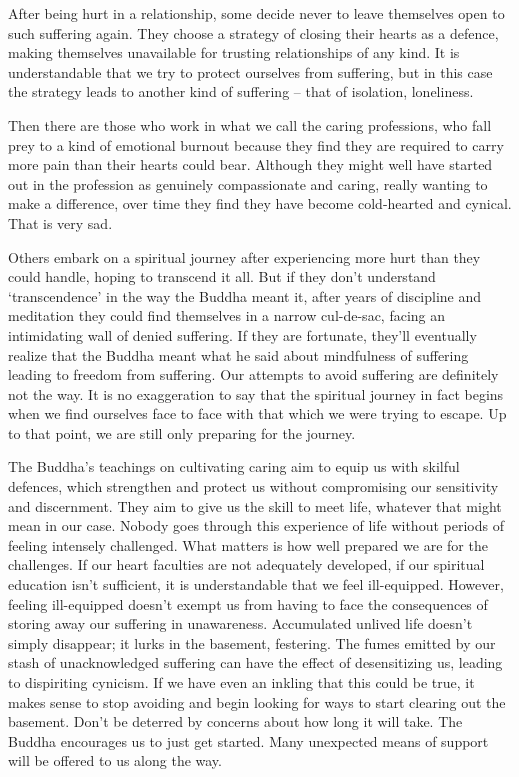 After being hurt in a relationship, some decide never to leave
themselves open to such suffering again. They choose a strategy of
closing their hearts as a defence, making themselves unavailable for
trusting relationships of any kind. It is understandable that we try to
protect ourselves from suffering, but in this case the strategy leads to
another kind of suffering – that of isolation, loneliness.

Then there are those who work in what we call the caring professions,
who fall prey to a kind of emotional burnout because they find they are
required to carry more pain than their hearts could bear. Although they
might well have started out in the profession as genuinely compassionate
and caring, really wanting to make a difference, over time they find
they have become cold-hearted and cynical. That is very sad.

Others embark on a spiritual journey after experiencing more hurt than
they could handle, hoping to transcend it all. But if they don’t
understand ‘transcendence’ in the way the Buddha meant it, after years
of discipline and meditation they could find themselves in a narrow
cul-de-sac, facing an intimidating wall of denied suffering. If they are
fortunate, they’ll eventually realize that the Buddha meant what he said
about mindfulness of suffering leading to freedom from suffering. Our
attempts to avoid suffering are definitely not the way. It is no
exaggeration to say that the spiritual journey in fact begins when we
find ourselves face to face with that which we were trying to escape. Up
to that point, we are still only preparing for the journey.

The Buddha’s teachings on cultivating caring aim to equip us with
skilful defences, which strengthen and protect us without compromising
our sensitivity and discernment. They aim to give us the skill to meet
life, whatever that might mean in our case. Nobody goes through this
experience of life without periods of feeling intensely challenged. What
matters is how well prepared we are for the challenges. If our heart
faculties are not adequately developed, if our spiritual education isn’t
sufficient, it is understandable that we feel ill-equipped. However,
feeling ill-equipped doesn’t exempt us from having to face the
consequences of storing away our suffering in unawareness. Accumulated
unlived life doesn’t simply disappear; it lurks in the basement,
festering. The fumes emitted by our stash of unacknowledged suffering
can have the effect of desensitizing us, leading to dispiriting
cynicism. If we have even an inkling that this could be true, it makes
sense to stop avoiding and begin looking for ways to start clearing out
the basement. Don’t be deterred by concerns about how long it will take.
The Buddha encourages us to just get started. Many unexpected means of
support will be offered to us along the way.

